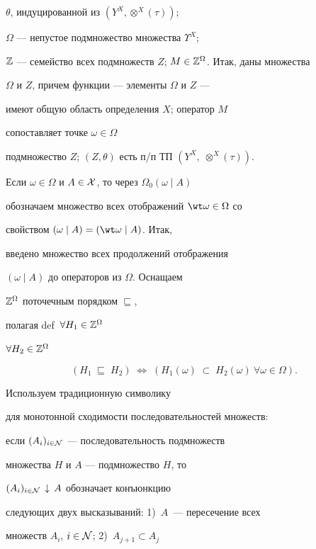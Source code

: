 $\theta$, индуцированной из $({Y^X},{{\otimes}^X}(\tau))$;


$\Omega$ --- непустое подмножество множества ${\Upsilon}^X$;


${\Bbb Z}$ --- семейство всех подмножеств $Z$; $M \in


{{\Bbb Z}^{\Omega}}$. Итак, даны множества


$\Omega$ и $Z$, причем функции --- элементы $\Omega$ и $Z$ ---


имеют общую область определения $X$; оператор $M$


сопоставляет точке $\omega \in \Omega$


подмножество $Z$; $(Z,\theta)$ есть п/п ТП $({Y^X},\;{{\otimes}^X}(\tau))$.





Если $\omega \in


\Omega$ и $A \in {\cal X}$, то через ${{\Omega}_0}(\omega \mid A)$


обозначаем множество всех отображений ${\wt \omega} \in \Omega$ со


свойством $(\omega \mid A) = ({\wt \omega} \mid A)$. Итак,


введено множество всех продолжений отображения


$(\omega \mid A)$ до операторов из $\Omega$. Оснащаем


${\Bbb Z}^{\Omega}$ поточечным порядком $\sqsubseteq$,


полагая def~$\forall{H_1} \in {{\Bbb Z}^{\Omega}}$


$\forall{H_2} \in {{\Bbb Z}^{\Omega}}$


$$


({H_1}\;\sqsubseteq\;{H_2})\;\Longleftrightarrow\;


({H_1}(\omega)\;\subset\;{H_2}(\omega)\ \forall{\omega} \in{\Omega}).


$$


Используем традиционную символику


для монотонной сходимости последовательностей множеств:


если $(A_i)_{i \in {\cal N}}$ --- последовательность подмножеств


множества $H$ и $A$ --- подмножество $H$, то


$(A_i)_{i \in {\cal N}}\,\downarrow\,A$ обозначает конъюнкцию


следующих двух высказываний: 1)~$A$~--- пересечение всех


множеств ${A_i}$, $i \in {\cal N}$; 2)~${A_{j+1}} \subset {A_j}$



